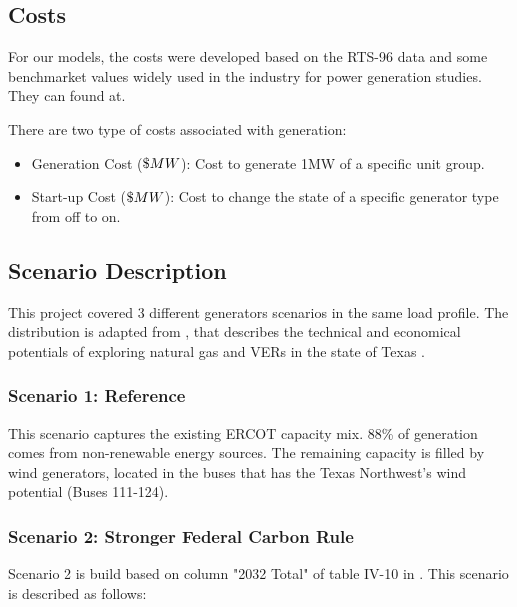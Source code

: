 \documentclass[12pt,LUDisStyle,twosided]{book}
\begin{document}
\subsection{Costs}

For our models, the costs were developed based on the RTS-96 data and some benchmarket values widely used in the industry for power generation studies. They can found at.

There are two type of costs associated with generation:

\begin{itemize}
\item Generation Cost ($\$\\MW$): Cost to generate 1MW of a specific unit group.
\item Start-up Cost ($\$\\MW$): Cost to change the state of a specific generator type from off to on.
\end{itemize}

\subsection{Scenario Description}

This project covered 3 different generators scenarios in the same load profile. The distribution is adapted from \citeauthor{shavel}, that describes the technical and economical potentials of exploring natural gas and VERs in the state of Texas \cite{shavel}. 

\subsubsection{Scenario 1: Reference}

This scenario captures the existing ERCOT capacity mix. 88\% of generation comes from non-renewable energy sources. The remaining capacity is filled by wind generators, located in the buses that has the Texas Northwest's wind potential (Buses 111-124).

\subsubsection{Scenario 2: Stronger Federal Carbon Rule}

Scenario 2 is build based on column "2032 Total" of table IV-10 in \cite{shavel}. This scenario is described as follows:
\end{document}
